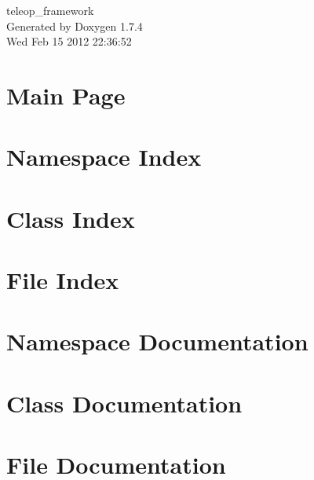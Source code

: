 \documentclass[a4paper]{book}
\begin{document}
\begin{titlepage}
\vspace*{7cm}
\begin{center}
{\Large teleop\_\-framework }\\
\vspace*{1cm}
{\large Generated by Doxygen 1.7.4}\\
\vspace*{0.5cm}
{\small Wed Feb 15 2012 22:36:52}\\
\end{center}
\end{titlepage}
\clearemptydoublepage
{}
\tableofcontents
\clearemptydoublepage
{}
\chapter{Main Page}
\label{index}
\chapter{Namespace Index}

\chapter{Class Index}

\chapter{File Index}

\chapter{Namespace Documentation}

\chapter{Class Documentation}






\chapter{File Documentation}






\printindex
\end{document}
